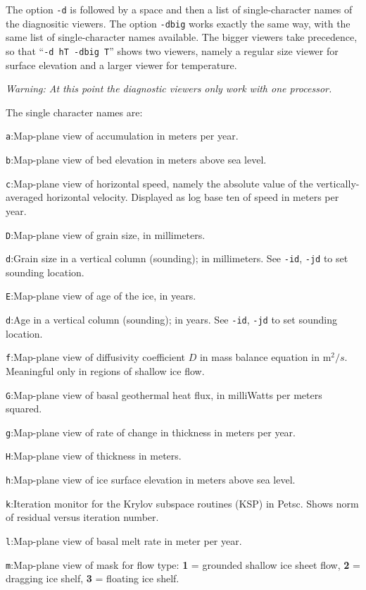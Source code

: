 \documentclass[final]{amsart}
\renewcommand{\t}[1]{\texttt{#1}}
\begin{document}
The option \t{-d} is followed by a space and then a list of single-character names of the diagnositic viewers.  The option \t{-dbig} works exactly the same way, with the same list of single-character names available.  The bigger viewers take precedence, so that ``\t{-d hT -dbig T}'' shows two viewers, namely a regular size viewer for surface elevation and a larger viewer for temperature.  

\emph{Warning: At this point the diagnostic viewers only work with one processor.}

The single character names are:

\verb|a|:\quad Map-plane view of accumulation in meters per year.

\verb|b|:\quad Map-plane view of bed elevation in meters above sea level.

\verb|c|:\quad Map-plane view of horizontal speed, namely the absolute value of the vertically-averaged horizontal velocity.  Displayed as log base ten of speed in meters per year.

\verb|D|:\quad Map-plane view of grain size, in millimeters.

\verb|d|:\quad Grain size in a vertical column (sounding); in millimeters.  See \verb|-id|, \verb|-jd| to set sounding location.

\verb|E|:\quad Map-plane view of age of the ice, in years.

\verb|d|:\quad Age in a vertical column (sounding); in years.  See \verb|-id|, \verb|-jd| to set sounding location.

\verb|f|:\quad Map-plane view of diffusivity coefficient $D$ in mass balance equation in $\text{m}^2/s$.  Meaningful only in regions of shallow ice flow.

\verb|G|:\quad Map-plane view of basal geothermal heat flux, in milliWatts per meters squared.

\verb|g|:\quad Map-plane view of rate of change in thickness in meters per year.

\verb|H|:\quad Map-plane view of thickness in meters.

\verb|h|:\quad Map-plane view of ice surface elevation in meters above sea level.

\verb|k|:\quad Iteration monitor for the Krylov subspace routines (KSP) in Petsc.  Shows norm of residual versus iteration number.

\verb|l|:\quad Map-plane view of basal melt rate in meter per year.

\verb|m|:\quad Map-plane view of mask for flow type:  \textbf{1} = grounded shallow ice sheet flow,  \textbf{2} = dragging ice shelf, \textbf{3} = floating ice shelf.
\end{document}
